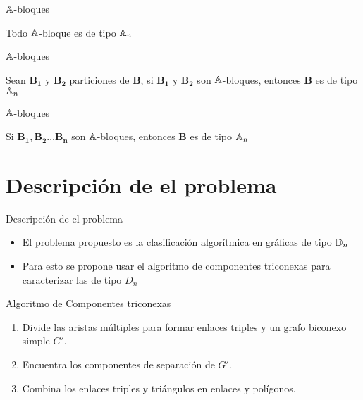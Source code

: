 \documentclass[spanish]{beamer}
\begin{document}
\begin{frame}{$\mathbb{A}$-bloques}
    \begin{lemma}
	Todo $\mathbb{A}$-bloque es de tipo $\mathbb{A}_{n}$
	\end{lemma}
\end{frame}

\begin{frame}{$\mathbb{A}$-bloques}
	\begin{lemma}
	Sean $\mathbf{B_{1}}$ y $\mathbf{B_{2}}$ particiones de $\mathbf{B}$, si $\mathbf{B_{1}}$ y $\mathbf{B_{2}}$ son $\mathbb{A}$-bloques, entonces $\mathbf{B}$ es de tipo $\mathbb{A}_{n}$
	\end{lemma}
\end{frame}

\begin{frame}{$\mathbb{A}$-bloques}
	\begin{lemma}
	Si $\mathbf{B_{1}}, \mathbf{B_{2}} \ldots \mathbf{B_{n}}$ son  $\mathbb{A}$-bloques, entonces $\mathbf{B}$ es de tipo $\mathbb{A}_{n}$
	\end{lemma}
\end{frame}

\section{Descripción de el problema}
\begin{frame}{Descripción de el problema}
  \begin{itemize}
     \item El problema propuesto es la clasificación algorítmica en gráficas de tipo $\mathbb{D}_{n}$
     \item Para esto se propone usar el algoritmo de componentes triconexas para caracterizar las de tipo $D_{n}$
    \end{itemize}	
\end{frame}

\begin{frame}{Algoritmo de Componentes triconexas}
  \begin{enumerate}
  	\item Divide las aristas múltiples para formar enlaces triples y un grafo biconexo simple $G'$.
    \item Encuentra los componentes de separación de $G'$.
    \item Combina los enlaces triples y triángulos en enlaces y polígonos.
  \end{enumerate}
\end{frame}
\end{document}
